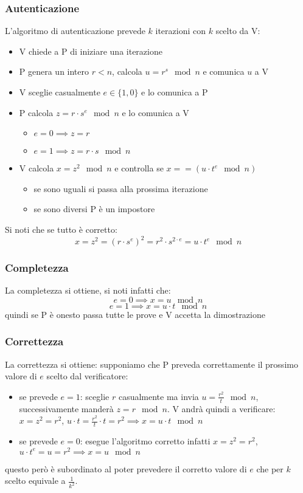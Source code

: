 \subsubsection{Autenticazione}
L'algoritmo di autenticazione prevede $k$ iterazioni con $k$ scelto da V:
\begin{itemize}
    \item V chiede a P di iniziare una iterazione
    \item P genera un intero $r < n$, calcola $u = r^s \mod n$ e comunica $u$ a V
    \item V sceglie casualmente $e \in \{1, 0\}$ e lo comunica a P
    \item P calcola $z = r \cdot s^e \mod n$ e lo comunica a V
    \begin{itemize}
        \item $e = 0 \implies z = r$
        \item $e = 1 \implies z = r \cdot s \mod n$
    \end{itemize}
    \item V calcola $x = z^2 \mod n$ e controlla se $x == (u \cdot t^e \mod n)$
    \begin{itemize}
        \item se sono uguali si passa alla prossima iterazione
        \item se sono diversi P è un impostore
    \end{itemize}
\end{itemize}

Si noti che se tutto è corretto:
$$
    x = z^2 = (r \cdot s^e)^2 = r^2 \cdot s^{2 \cdot e} = u \cdot t^{e} \mod n
$$

\subsubsection{Completezza}
La completezza si ottiene, si noti infatti che:
$$ e = 0 \implies x = u \mod n $$
$$ e = 1 \implies x = u \cdot t \mod n $$
quindi se P è onesto passa tutte le prove e V accetta la dimostrazione

\subsubsection{Correttezza}
La correttezza si ottiene: supponiamo che P preveda correttamente il prossimo valore di $e$ scelto dal verificatore:
\begin{itemize}
    \item se prevede $e = 1$: sceglie $r$ casualmente ma invia $u = \frac{r^2}{t} \mod n$, successivamente manderà $z = r \mod n$. V andrà quindi a verificare: $x = z^2 = r^2$, $u \cdot t = \frac{r^2}{t} \cdot t = r^2 \implies x = u \cdot t \mod n$
    \item se prevede $e = 0$: esegue l'algoritmo corretto infatti $x = z^2 = r^2$, $u \cdot t^e = u = r^2 \implies x = u \mod n$
\end{itemize}
questo però è subordinato al poter prevedere il corretto valore di $e$ che per $k$ scelto equivale a $\frac{1}{k^2}$.

